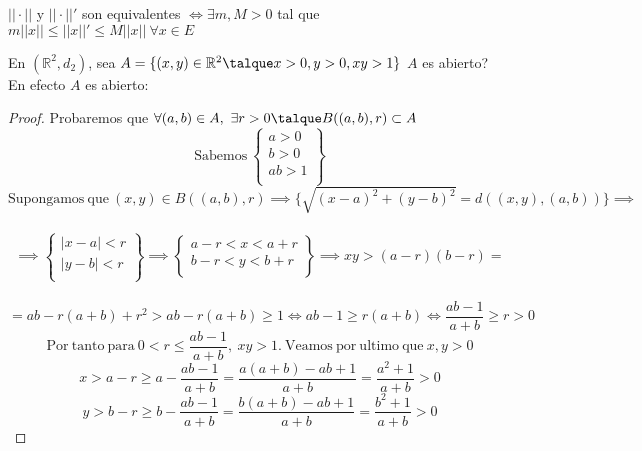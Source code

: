 	\begin{proposicion} $||\cdot||$ y $||\cdot||'$ son equivalentes $\iff \exists m,M>0$ tal que\\
	$m||x||\leq||x||'\leq M||x||\ \forall x\in E$
	\end{proposicion}
	\newpage
	\begin{ejem}
		En $(\mathbb{R}^2,d_2)$, sea $A=\{(x,y)\in \mathbb{R}^2\talque x>0,y>0,xy>1\}$ $A$ es abierto?\\
		
		En efecto $A$ es abierto:
		\begin{proof}		
			Probaremos que $\forall(a,b)\in A,\ \exists r>0\talque B((a,b),r)\subset A$
			\[\mathrm{Sabemos\ }  \left\{
				\begin{array}{ll}
					a>0 \\
			 		b>0 \\
					ab>1\\
		       \end{array}
		    \right\}\]
			\[\mathrm{Supongamos\ que\ }(x,y)\in B((a,b),r)\implies\{\sqrt{(x-a)^2+(y-b)^2}=d((x,y),(a,b))\}\implies \] \\
	\[\implies \left\{
	       \begin{array}{ll}
		 |x-a|<r \\
		 |y-b|<r \\
	       \end{array}
	     \right\}\implies \left\{
	       \begin{array}{ll}
		 a-r<x<a+r \\
		 b-r<y<b+r \\
	       \end{array}
	     \right\}\implies xy>(a-r)(b-r)=\] \\
	     \[=ab-r(a+b)+r^2>ab-r(a+b)\geq 1\iff ab-1\geq r(a+b)\iff\dfrac{ab-1}{a+b}\geq r>0\]
	     \[\mathrm{Por\ tanto\ para\ }0<r\leq \dfrac{ab-1}{a+b},\ xy>1.\mathrm{\ Veamos\ por\ ultimo\ que\ }x,y>0\]
	     \[ x>a-r\geq a-\dfrac{ab-1}{a+b}=\dfrac{a(a+b)-ab+1}{a+b}=\dfrac{a^2+1}{a+b}>0 \]
		 \[y>b-r\geq b-\dfrac{ab-1}{a+b}=\dfrac{b(a+b)-ab+1}{a+b}=\dfrac{b^2+1}{a+b}>0 \]
		\end{proof}
		\begin{figura}\ \\
	\begin{center}
	\end{center}
	\end{figura}
	\end{ejem}